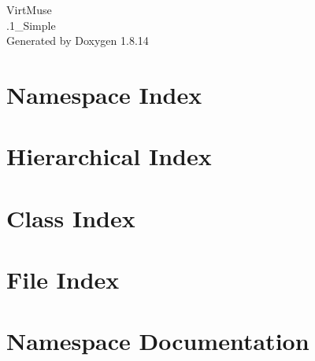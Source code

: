 \documentclass[twoside]{book}
\newcommand{\+}{\discretionary{\mbox{\scriptsize$\hookleftarrow$}}{}{}}
\newcommand{\clearemptydoublepage}{%
  \newpage{\pagestyle{empty}\cleardoublepage}%
}
\begin{document}
\hypersetup{pageanchor=false,
             bookmarksnumbered=true,
             pdfencoding=unicode
            }
\begin{titlepage}
\vspace*{7cm}
\begin{center}%
{\Large Virt\+Muse \\[1ex]\large .1\+\_\+\+Simple }\\
\vspace*{1cm}
{\large Generated by Doxygen 1.8.14}\\
\end{center}
\end{titlepage}
\clearemptydoublepage
{}
\tableofcontents
\clearemptydoublepage
{}
\hypersetup{pageanchor=true}

\chapter{Namespace Index}

\chapter{Hierarchical Index}

\chapter{Class Index}

\chapter{File Index}

\chapter{Namespace Documentation}



\end{document}

